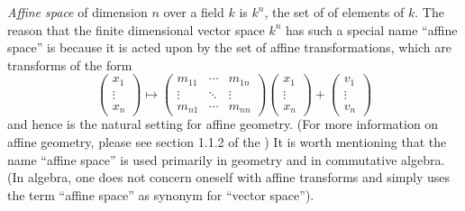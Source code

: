 \documentclass[12pt]{article}
\begin{document}
{\em Affine space} of dimension $n$ over a field $k$ is $k^n$, the set of  of elements of $k$.  The reason that the finite dimensional vector space $k^n$ has such a special name ``affine space'' is because it is acted upon by the set of affine transformations, which are transforms of the form
 $$\left( \begin{matrix} x_1 \\ \vdots \\ x_n \end{matrix} \right) \mapsto \left( \begin{matrix} m_{11} & \cdots & m_{1n} \\ \vdots & \ddots & \vdots \\ m_{n1} & \cdots & m_{nn} \end{matrix} \right) \left( \begin{matrix} x_1 \\ \vdots \\ x_n \end{matrix} \right) + \left( \begin{matrix} v_1 \\ \vdots \\ v_n \end{matrix} \right)$$
and hence is the natural setting for affine geometry.  (For more information on affine geometry, please see section 1.1.2 of the )  It is worth mentioning that the name ``affine space'' is used primarily in geometry and in commutative algebra.  (In algebra, one does not concern oneself with affine transforms and simply uses the term ``affine space'' as synonym for ``vector space'').
\end{document}
